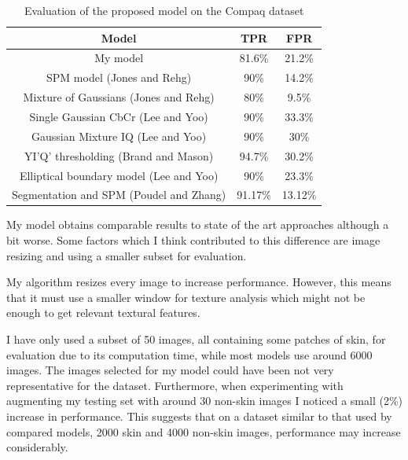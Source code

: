 \documentclass[12pt]{report}
\begin{document}
	\begin{table}[h!]
		\begin{center}
			\caption{Evaluation of the proposed model on the Compaq dataset}
			\label{tab:results_comparison}
			\begin{tabular}{c|c|c}
				\textbf{Model} & \textbf{TPR} & \textbf{FPR} \\
				\hline
				My model & 81.6\% & 21.2\% \\
				SPM model (Jones and Rehg\cite{compaq}) & 90\% & 14.2\% \\
				Mixture of Gaussians (Jones and Rehg\cite{compaq}) & 80\% & 9.5\% \\
				Single Gaussian CbCr (Lee and Yoo\cite{gaussian_applied}) & 90\% & 33.3\% \\
				Gaussian Mixture IQ (Lee and Yoo\cite{gaussian_applied}) & 90\% & 30\% \\
				YI'Q' thresholding (Brand and Mason\cite{i_threshold_applied}) & 94.7\% & 30.2\% \\
				Elliptical boundary model (Lee and Yoo\cite{gaussian_applied}) &
				90\% & 23.3\% \\
				Segmentation and SPM (Poudel and Zhang\cite{superpixels_applied_2}) & 91.17\% & 13.12\% \\
				
			\end{tabular}
		\end{center}
	\end{table}
	
	My model obtains comparable results to state of the art approaches although a bit worse. Some factors which I think contributed to this difference are image resizing and using a smaller subset for evaluation. 
	
	My algorithm resizes every image to increase performance. However, this means that it must use a smaller window for texture analysis which might not be enough to get relevant textural features.
	
	I have only used a subset of 50 images, all containing some patches of skin, for evaluation due to its computation time, while most models use around 6000 images. The images selected for my model could have been not very representative for the dataset. Furthermore, when experimenting with augmenting my testing set with around 30 non-skin images I noticed a small (2\%) increase in performance. This suggests that on a dataset similar to that used by compared models, 2000 skin and 4000 non-skin images, performance may increase considerably.
	
\end{document}
